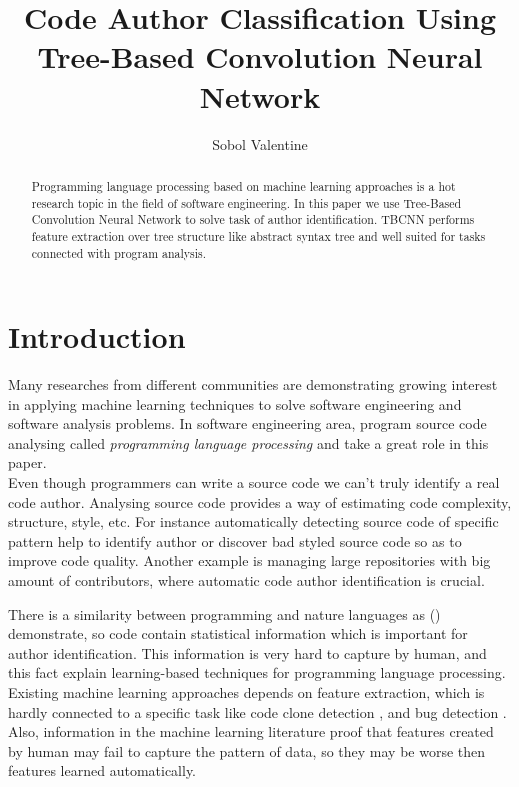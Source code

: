 \documentclass[11pt,technote]{IEEEtran}
\title{Code Author Classification Using Tree-Based Convolution Neural Network}
\author{Sobol Valentine}
\begin{document}
\maketitle

\begin{abstract}
Programming language processing based on machine learning approaches is a hot research topic in the field of
software engineering. In this paper we use Tree-Based Convolution Neural Network to solve task of author identification. TBCNN performs feature extraction over tree structure like abstract syntax tree and well suited 
for tasks connected with program analysis.
\end{abstract}

\section{Introduction}
Many researches from different communities are demonstrating growing interest in applying 
machine learning techniques to solve software engineering and software analysis problems. 
In software engineering area, program source code analysing called  \textit{programming language processing}
and take a great role in this paper.\\

Even though programmers can write a source code we can't truly identify a real code author.
Analysing source code provides a way of estimating code complexity, structure, style, etc. 	
For instance automatically detecting source code of specific pattern help to identify author 
or discover bad styled source code so as to improve code quality. Another example is managing large
repositories with big amount of contributors, where automatic code author identification is crucial.

There is a similarity between programming and nature languages as \cite{naturalness} (\citeyear{naturalness})  demonstrate, so code contain statistical information which is important for author
identification. This information is very hard to capture by human, and this fact explain learning-based 
techniques for programming language processing. Existing machine learning approaches depends on feature 
extraction, which is hardly connected to a specific task like code clone detection \cite{sim}, and bug detection \cite{bug}. Also, information in the machine learning literature proof that features created by human may fail
to capture the pattern of data, so they may be worse then features learned automatically.
\end{document}
